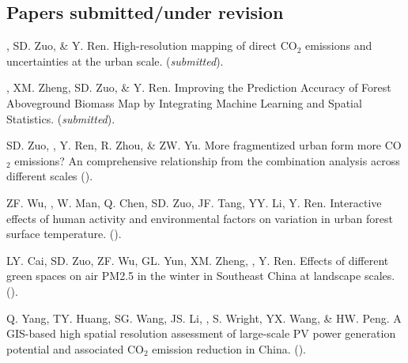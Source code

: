 \subsection*{Papers submitted/under revision}
\begin{etaremune}
\item
    \Shaoqing, SD. Zuo, \& Y. Ren.
    High-resolution mapping of direct CO$_2$ emissions and uncertainties at the urban scale. 
    (\textit{submitted}).
\item
    \Shaoqing\CF, XM. Zheng, SD. Zuo, \& Y. Ren.
    Improving the Prediction Accuracy of Forest Aboveground Biomass Map by Integrating Machine Learning and Spatial Statistics. 
    (\textit{submitted}).
\item
    SD. Zuo, \Shaoqing, Y. Ren, R. Zhou, \&  ZW. Yu.
    More fragmentized urban form more CO$_2$ emissions? An comprehensive relationship from the combination analysis across different scales 
    (\Review).
\item
    ZF. Wu, \Shaoqing, W. Man, Q. Chen, SD. Zuo, JF. Tang, YY. Li, Y. Ren.
    Interactive effects of human activity and environmental factors on variation in urban forest surface temperature. 
    (\Review).
\item
    LY. Cai, SD. Zuo, ZF. Wu, GL. Yun, XM. Zheng, \Shaoqing, Y. Ren.
    Effects of different green spaces on air PM2.5 in the winter in Southeast China at landscape scales.
    (\Review).
\item
    Q. Yang, TY. Huang, SG. Wang, JS. Li, \Shaoqing, S. Wright, YX. Wang, \& HW. Peng.
    A GIS-based high spatial resolution assessment of large-scale PV power generation potential and associated CO$_2$ emission reduction in China.
    (\Review).
\end{etaremune}
